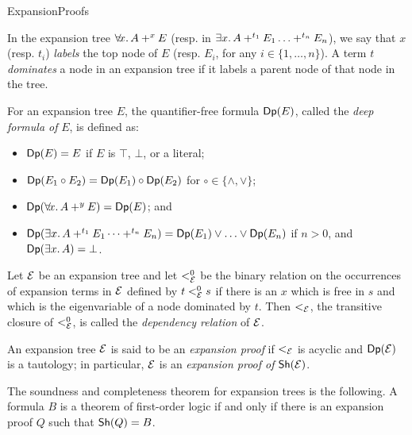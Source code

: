 \begin{entry}{ExpansionProofs}
\begin{calculus}
\medskip

In the expansion tree $\ALLx x. A +^x E$ (resp. in $\EX x. A +^{t_1} E_1
\ldots +^{t_n} E_n$), we say that $x$ (resp. $t_i$) \emph{labels} the top node
of $E$ (resp. $E_i$, for any $i \in\{1,\ldots,n\}$).  A term
$t$ \emph{dominates} a node in an expansion tree if it labels a parent
node of that node in the tree.

\medskip

For an expansion tree $E$, the quantifier-free formula $\mathsf{Dp}(E)$, 
called the \emph{deep formula of} $E$, is defined as:
\begin{itemize}
\item $\mathsf{Dp}(E) = E$ if $E$ is $\top$, $\bot$, or a literal;
\item $\mathsf{Dp}(E_1 \circ E_2) = \mathsf{Dp}(E_1) \circ \mathsf{Dp}(E_2)$ for
      $\circ\in\{\land, \lor \}$; 
\item $\Deep{\ALLx x. A +^y E} = \Deep{E}$; and
\item $\Deep{\EX x. A +^{t_1} E_1 \cdots +^{t_n} E_n} = 
       \Deep{E_1}\lor\ldots\lor \Deep{E_n}$ if $n > 0$, and $\Deep{\EX
  x. A} = \bot$. 
\end{itemize}

Let $\mathcal{E}$ be an expansion tree and let $<^0_{\mathcal{E}}$ be the binary
relation on the occurrences of expansion terms in $\mathcal{E}$ defined by
$t <^0_{\mathcal{E}} s$ if there is an $x$ which is free in $s$ and which is
the eigenvariable of a node dominated by $t$.  Then $<_{\mathcal{E}}$, the
transitive closure of $<^0_{\mathcal{E}}$, is called the
\emph{dependency relation} of $\mathcal{E}$.

\medskip

An expansion tree $\mathcal{E}$ is said to be an \emph{expansion proof} if
$<_{\mathcal{E}}$ is acyclic and $\mathsf{Dp}(\mathcal{E})$ is a tautology; in particular,
$\mathcal{E}$ is an \emph{expansion proof of} $\mathsf{Sh}(\mathcal{E})$.
\end{calculus}


\begin{clarifications}
The soundness and completeness theorem for expansion trees is the
following.  A formula $B$ is a theorem of first-order logic if and
only if there is an expansion proof $Q$ such that $\mathsf{Sh}(Q)=B$.
\end{clarifications}


\end{entry}

